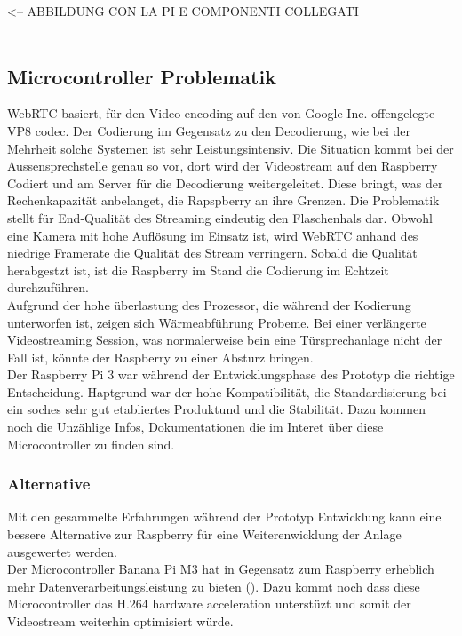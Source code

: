 <-- ABBILDUNG CON LA PI E COMPONENTI COLLEGATI
\\
\\

\subsection{Microcontroller Problematik}
\label{sec:microcontroller}
WebRTC basiert, für den Video encoding auf den von Google Inc. offengelegte VP8 codec. Der Codierung im Gegensatz zu den Decodierung, wie bei der Mehrheit solche Systemen ist sehr Leistungsintensiv. Die Situation kommt bei der Aussensprechstelle genau so vor, dort wird der Videostream auf den Raspberry Codiert und am Server für die Decodierung weitergeleitet. Diese bringt, was der Rechenkapazität anbelanget,  die Rapspberry  an ihre Grenzen. Die Problematik stellt für End-Qualität des Streaming eindeutig den Flaschenhals dar. Obwohl eine Kamera mit hohe Auflösung im Einsatz ist, wird WebRTC anhand des niedrige Framerate die Qualität des Stream verringern. Sobald die Qualität herabgestzt ist, ist die Raspberry im Stand die Codierung im Echtzeit durchzuführen.
\\
Aufgrund der hohe überlastung des Prozessor, die während der Kodierung unterworfen ist, zeigen sich Wärmeabführung Probeme. Bei einer verlängerte Videostreaming Session, was normalerweise bein eine Türsprechanlage nicht der Fall ist, könnte der Raspberry zu einer Absturz bringen. 
\\
Der Raspberry Pi 3 war während der Entwicklungsphase des Prototyp die richtige Entscheidung. Haptgrund war der hohe Kompatibilität, die Standardisierung bei ein soches sehr gut etabliertes Produktund und die Stabilität. Dazu kommen noch die Unzählige Infos, Dokumentationen die im Interet über diese Microcontroller zu finden sind.

\subsubsection{Alternative}
Mit den gesammelte Erfahrungen während der Prototyp Entwicklung kann eine bessere Alternative zur Raspberry für eine Weiterenwicklung der Anlage ausgewertet werden. 
\\
Der Microcontroller Banana Pi M3 hat in Gegensatz zum Raspberry erheblich mehr Datenverarbeitungsleistung zu bieten (). Dazu kommt noch dass diese Microcontroller das H.264 hardware acceleration unterstüzt und somit der Videostream weiterhin optimisiert würde.

